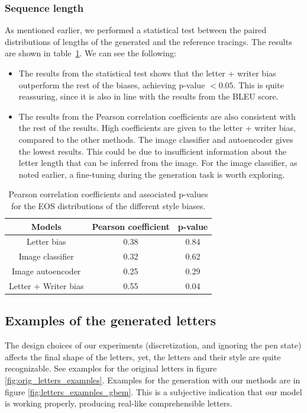 \subsubsection{Sequence length}
\par As mentioned earlier, we performed a statistical test between the paired distributions of lengths of the generated and the reference tracings. The results are shown in table~\ref{table:2}. We can see the following:
\begin{itemize}
    \item The results from the statistical test shows that the letter + writer bias outperform the rest of the biases, achieving p-value $< 0.05$. This is quite reassuring, since it is also in line with the results from the BLEU score.
    \item The results from the Pearson correlation coefficients are also consistent with the rest of the results. High coefficients are given to the letter + writer bias, compared to the other methods. The image classifier and autoencoder gives the lowest results. This could be due to insufficient information about the letter length that can be inferred from the image. For the image classifier, as noted earlier, a fine-tuning during the generation task is worth exploring.
\end{itemize}

\begin{table}[!htbp]
\centering
\begin{tabular}{|c|c|c|}
\hline
Models & Pearson coefficient & p-value \\ \hline
Letter bias & 0.38 & 0.84 \\ \hline
Image classifier & 0.32 & 0.62\\ \hline
Image autoencoder & 0.25 & 0.29 \\ \hline
Letter + Writer bias & 0.55 & 0.04\\ \hline
\end{tabular}
\caption{Pearson correlation coefficients and associated p-values for the EOS distributions of the different style biases.}

\label{table:2}
\end{table}

\subsection{Examples of the generated letters}
\par The design choices of our experiments (discretization, and ignoring the pen state) affects the final shape of the letters, yet, the letters and their style are quite recognizable. See examples for the original letters in figure \ref{fig:orig_letters_examples}. Examples for the generation with our methods are in figure \ref{fig:letters_examples_gbem}. This is a subjective indication that our model is working properly, producing real-like comprehensible letters.

